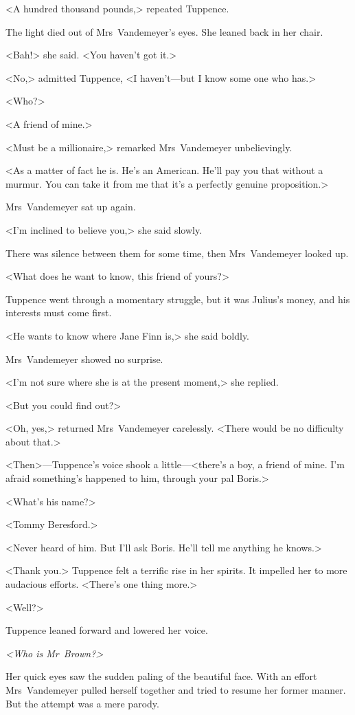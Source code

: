 <A hundred thousand pounds,> repeated Tuppence.

The light died out of Mrs~Vandemeyer's eyes. She leaned back in her chair.

<Bah!> she said. <You haven't got it.>

<No,> admitted Tuppence, <I haven't—but I know some one who has.>

<Who?>

<A friend of mine.>

<Must be a millionaire,> remarked Mrs~Vandemeyer unbelievingly.

<As a matter of fact he is. He's an American. He'll pay you that without a murmur. You can take it from me that it's a perfectly genuine proposition.>

Mrs~Vandemeyer sat up again.

<I'm inclined to believe you,> she said slowly.

There was silence between them for some time, then Mrs~Vandemeyer looked up.

<What does he want to know, this friend of yours?>

Tuppence went through a momentary struggle, but it was Julius's money, and his interests must come first.

<He wants to know where Jane Finn is,> she said boldly.

Mrs~Vandemeyer showed no surprise.

<I'm not sure where she is at the present moment,> she replied.

<But you could find out?>

<Oh, yes,> returned Mrs~Vandemeyer carelessly. <There would be no difficulty about that.>

<Then>—Tuppence's voice shook a little—<there's a boy, a friend of mine. I'm afraid something's happened to him, through your pal Boris.>

<What's his name?>

<Tommy Beresford.>

<Never heard of him. But I'll ask Boris. He'll tell me anything he knows.>

<Thank you.> Tuppence felt a terrific rise in her spirits. It impelled her to more audacious efforts. <There's one thing more.>

<Well?>

Tuppence leaned forward and lowered her voice.

\emph{<Who is Mr~Brown?>}

Her quick eyes saw the sudden paling of the beautiful face. With an effort Mrs~Vandemeyer pulled herself together and tried to resume her former manner. But the attempt was a mere parody.

